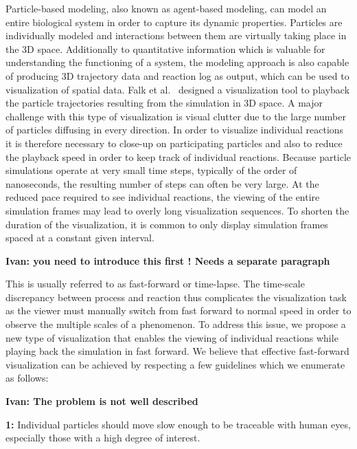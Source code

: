 Particle-based modeling, also known as agent-based modeling, can model an entire biological system in order to capture its dynamic properties.
Particles are individually modeled and interactions between them are virtually taking place in the 3D space.
Additionally to quantitative information which is valuable for understanding the functioning of a system, the modeling approach is also capable of producing 3D trajectory data and reaction log as output, which can be used to visualization of spatial data.
Falk et al.~\cite{falk2009visualization} designed a visualization tool to playback the particle trajectories resulting from the simulation in 3D space.
A major challenge with this type of visualization is visual clutter due to the large number of particles diffusing in every direction.
In order to visualize individual reactions it is therefore necessary to close-up on participating particles and also to reduce the playback speed in order to keep track of individual reactions.
Because particle simulations operate at very small time steps, typically of the order of nanoseconds, the resulting number of steps can often be very large. 
At the reduced pace required to see individual reactions, the viewing of the entire simulation frames may lead to overly long visualization sequences.
To shorten the duration of the visualization, it is common to only display simulation frames spaced at a constant given interval. 

\textbf{Ivan: you need to introduce this first ! Needs a separate paragraph}

This is usually referred to as fast-forward or time-lapse.
The time-scale discrepancy between process and reaction thus complicates the visualization task as the viewer must manually switch from fast forward to normal speed in order to observe the multiple scales of a phenomenon.
To address this issue, we propose a new type of visualization that enables the viewing of individual reactions while playing back the simulation in fast forward.
We believe that effective fast-forward visualization can be achieved by respecting a few guidelines which we enumerate as follows:

\textbf{Ivan: The problem is not well described}

\textbf{1:} Individual particles should move slow enough to be traceable with human eyes, especially those with a high degree of interest.

